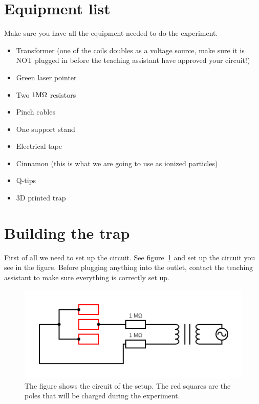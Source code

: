 \documentclass[%
oneside,                 %
final,                   %
10pt]{article}
\begin{document}
\section{Equipment list}
\label{title:equip_list}
Make sure you have all the equipment needed to do the experiment.
\begin{itemize}
  \item Transformer (one of the coils doubles as a voltage source, make sure it is NOT plugged in before the teaching assistant have approved your circuit!)

  \item Green laser pointer

  \item Two $1\rm{M}\Omega$ resistors

  \item Pinch cables

  \item One support stand

  \item Electrical tape

  \item Cinnamon (this is what we are going to use as ionized particles)

  \item Q-tips

  \item 3D printed trap
\end{itemize}

\noindent
\section{Building the trap}
\label{title:build}
First of all we need to set up the circuit. See figure~\ref{fig:circuit} and set up the circuit you see in the figure. Before plugging anything into the outlet, contact the teaching assistant to make sure everything is correctly set up.


\begin{figure}[!ht]  %
  \centerline{\includegraphics[width=0.9\linewidth]{figurer/circuit.png}}
  \caption{
  The figure shows the circuit of the setup. The red squares are the poles that will be charged during the experiment. \label{fig:circuit}
  }
\end{figure}
\end{document}
